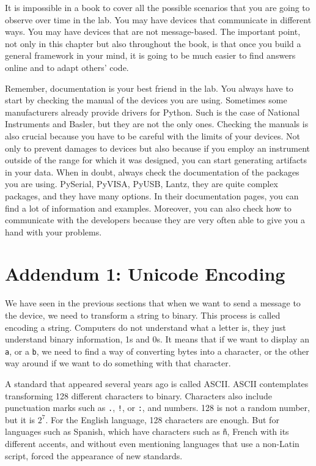 It is impossible in a book to cover all the possible scenarios that you are going to observe over time in the lab. You may have devices that communicate in different ways. You may have devices that are not message-based. The important point, not only in this chapter but also throughout the book, is that once you build a general framework in your mind, it is going to be much easier to find answers online and to adapt others' code.

Remember, documentation is your best friend in the lab. You always have to start by checking the manual of the devices you are using. Sometimes some manufacturers already provide drivers for Python. Such is the case of National Instruments and Basler, but they are not the only ones. Checking the manuals is also crucial because you have to be careful with the limits of your devices. Not only to prevent damages to devices but also because if you employ an instrument outside of the range for which it was designed, you can start generating artifacts in your data. When in doubt, always check the documentation of the packages you are using. PySerial, PyVISA, PyUSB, Lantz, they are quite complex packages, and they have many options. In their documentation pages, you can find a lot of information and examples. Moreover, you can also check how to communicate with the developers because they are very often able to give you a hand with your problems.

\section{Addendum 1: Unicode Encoding}\label{sec:unicode}
We have seen in the previous sections that when we want to send a message to the device, we need to transform a string to binary. This process is called encoding a string. Computers do not understand what a letter is, they just understand binary information, 1s and 0s. It means that if we want to display an \texttt{a}, or a \texttt{b}, we need to find a way of converting bytes into a character, or the other way around if we want to do something with that character.

A standard that appeared several years ago is called ASCII. ASCII contemplates transforming 128 different characters to binary. Characters also include punctuation marks such as \texttt{.}, \texttt{!}, or \texttt{:}, and numbers. 128 is not a random number, but it is $2^7$. For the English language, 128 characters are enough. But for languages such as Spanish, which have characters such as \texttt{ñ}, French with its different accents, and without even mentioning languages that use a non-Latin script, forced the appearance of new standards.

